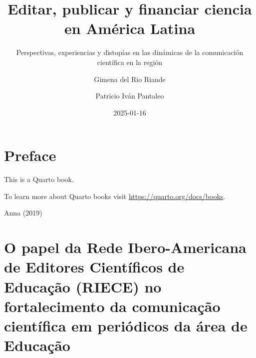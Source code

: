 \documentclass[
  a4paper,
]{book}
\title{Editar, publicar y financiar ciencia en América Latina}
\subtitle{Perspectivas, experiencias y distopías en las dinámicas de la
comunicación científica en la región}
\author{Gimena del Rio Riande \and Patricio Iván Pantaleo}
\date{2025-01-16}
\renewcommand*\contentsname{Tabla de contenidos}
\newcommand\contentsname{Tabla de contenidos}
\begin{document}
\frontmatter
\maketitle

\renewcommand*\contentsname{Tabla de contenidos}
{
\setcounter{tocdepth}{2}
\tableofcontents
}

\mainmatter
{}

\chapter*{Preface}\label{preface}


This is a Quarto book.

To learn more about Quarto books visit
\url{https://quarto.org/docs/books}.

Anna (2019)


\chapter{O papel da Rede Ibero-Americana de Editores Científicos de
Educação (RIECE) no fortalecimento da comunicação científica em
periódicos da área de
Educação}\label{o-papel-da-rede-ibero-americana-de-editores-cientuxedficos-de-educauxe7uxe3o-riece-no-fortalecimento-da-comunicauxe7uxe3o-cientuxedfica-em-periuxf3dicos-da-uxe1rea-de-educauxe7uxe3o}
\end{document}
